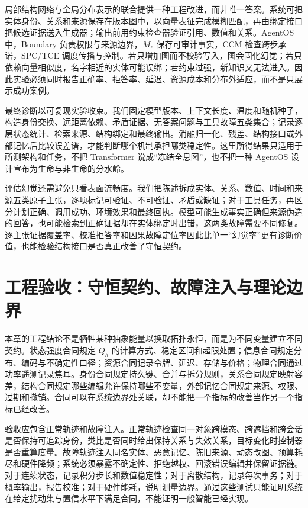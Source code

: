 局部结构网络与全局分布表示的联合提供一种工程改进，而非唯一答案。系统可把实体身份、关系和来源保存在版本图中，以向量表征完成模糊匹配，再由绑定接口把候选证据送入生成器；输出前用约束检查器验证引用、数值和关系。AgentOS 中，Boundary 负责权限与来源边界，$M_e$ 保存可审计事实，CCM 检查跨步承诺，SPC/TCE 调度传播与控制。若只增加图而不校验写入，图会固化幻觉；若只依赖向量相似度，名字相近的实体可能误绑；若约束过强，新知识又无法进入。因此实验必须同时报告正确率、拒答率、延迟、资源成本和分布外适应，而不是只展示成功案例。

最终诊断以可复现实验收束。我们固定模型版本、上下文长度、温度和随机种子，构造身份交换、远距离依赖、矛盾证据、无答案问题与工具故障五类集合；记录逐层状态统计、检索来源、结构绑定和最终输出。消融归一化、残差、结构接口或外部记忆后比较误差谱，才能判断哪个机制承担哪类稳定性。这里所得结果只适用于所测架构和任务，不把 Transformer 说成“冻结全息图”，也不把一种 AgentOS 设计宣布为生命与非生命的分水岭。

评估幻觉还需避免只看表面流畅度。我们把陈述拆成实体、关系、数值、时间和来源五类原子主张，逐项标记可验证、不可验证、矛盾或缺证；对于工具任务，再区分计划正确、调用成功、环境效果和最终回执。模型可能生成事实正确但来源伪造的回答，也可能检索到正确证据却在实体绑定时出错，这两类故障需要不同修复。逐主张证据覆盖率、校准拒答率和因果故障定位率因此比单一“幻觉率”更有诊断价值，也能检验结构接口是否真正改善了守恒契约。

\section{工程验收：守恒契约、故障注入与理论边界}
\label{sec:conclusion_the_creators_exquisite_trade}

本章的工程结论不是牺牲某种抽象能量以换取拓扑永恒，而是为不同变量建立不同契约。状态强度合同规定 $Q_h$ 的计算方式、稳定区间和超限处置；信息合同规定分布、编码与不确定性口径；资源合同记录令牌、延迟、存储与价格；物理合同通过功率遥测记录焦耳。身份合同规定持久键、合并与拆分规则，关系合同规定映射容差，结构合同规定哪些编辑允许保持哪些不变量，外部记忆合同规定来源、权限、过期和撤销。合同可以在系统边界处关联，却不能把一个指标的改善当作另一个指标已经改善。

验收应包含正常轨迹和故障注入。正常轨迹检查同一对象跨模态、跨遮挡和跨会话是否保持可追踪身份，类比是否同时给出保持关系与失效关系，目标变化时控制器是否重算度量。故障轨迹注入同名实体、恶意记忆、陈旧来源、动态改图、预算耗尽和硬件降频；系统必须暴露不确定性、拒绝越权、回滚错误编辑并保留证据链。对于连续状态，记录积分步长和数值稳定性；对于离散结构，记录每次事务；对于概率输出，报告校准；对于硬件能耗，说明测量边界。通过这些测试只能证明系统在给定扰动集与置信水平下满足合同，不能证明一般智能已经实现。

